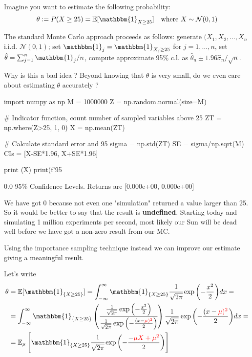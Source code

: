 Imagine you want to estimate the following probability:
\begin{equation}	
\theta := P(X\geq 25) = \mathbb{E}[\mathbbm{1}_{X\geq 25}]  \quad\text{where } X\sim \mathcal{N}(0, 1)
\end{equation}

The standard Monte Carlo approach proceeds as follows: generate $(X_1, X_2, \ldots ,X_n$ i.i.d. $\mathcal{N}(0,1)$; set $\mathbbm{1}_j=\mathbbm{1}_{X_j\geq 25}$ for $j=1,\ldots ,n$, set
$\hat{\theta}=\sum_{j=1}^n \mathbbm{1}_j/n$, compute approximate 95\% c.l. as $\hat{\theta}_n\pm 1.96\hat{\sigma}_n/\sqrt{n}$.

Why is this a bad idea ? Beyond knowing that $\theta$ is very small, do we even care about estimating $\theta$ accurately ?

\begin{ipythonnon}
import numpy as np
M = 1000000
Z = np.random.normal(size=M)

# Indicator function, count number of sampled variables above 25
ZT = np.where(Z>25, 1, 0)
X = np.mean(ZT)

# Calculate standard error and 95%
sigma = np.std(ZT)
SE = sigma/np.sqrt(M)
CIs = [X-SE*1.96, X+SE*1.96]

print (X)
print(f'95%
\end{ipythonnon}
\begin{ioutput}
0.0
95\% Confidence Levels. Returns are [0.000e+00, 0.000e+00]
\end{ioutput}

We have got 0 because not even one "simulation" returned a value larger than 25. So it would be better to say that the result is \textbf{undefined}.
Starting today and simulating 1 million experiments per second, most likely our Sun will be dead well before we have got a non-zero result from our MC.

Using the importance sampling technique instead we can improve our estimate giving a meaningful result.

Let's write 
\begin{equation}
	\begin{aligned}
		\theta &= \mathbb{E}[\mathbbm{1}_{\{X\geq 25\}}] = \int_{-\infty}^{\infty}\mathbbm{1}_{\{X\geq 25\}}\cfrac{1}{\sqrt{2\pi}}\exp{\left(-\frac{x^2}{2}\right)}dx = \\
		&= \int_{-\infty}^{\infty}\mathbbm{1}_{\{X\geq 25\}} \left(
		\cfrac{\frac{1}{\sqrt{2\pi}}\exp{\left(-\frac{x^2}{2}\right)}}{\frac{1}{\sqrt{2\pi}}\exp{\left(-\frac{(x-\color{red}{\mu})^2}{2}\right)}}
		\right) \frac{1}{\sqrt{2\pi}}\exp{\left(-\frac{(x-\color{red}{\mu})^2}{2}\right)}dx =\\
		&= \mathbb{E}_\mu\left[\mathbbm{1}_{\{X\geq 25\}} \cfrac{1}{\sqrt{2\pi}}\exp{\left(-\frac{-\color{red}\mu X+\color{red}\mu^2}{2}\right)} \right]
	\end{aligned}
\end{equation}

